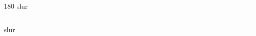
\begin{frame}
\begin{center}
\begin{turn}{180}
{\fontsize{2.5cm}{1em}\selectfont slur}
\end{turn}
\vspace{1em}\par  
\hrule
\vspace{1em}\par  
{\fontsize{2.5cm}{1em}\selectfont slur}
\end{center}
\end{frame}
